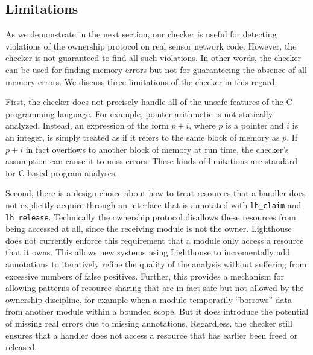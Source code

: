 \subsection{Limitations}

As we demonstrate in the next section, our checker is useful for
detecting violations of the ownership protocol on real sensor network
code.  However, the checker is not guaranteed to find all such
violations.  In other words, the checker can be used for finding
memory errors but not for guaranteeing the absence of all memory
errors.  We discuss three limitations of the checker in this regard.

First, the checker does not precisely handle all of the unsafe
features of the C programming language.  For example, pointer
arithmetic is not statically analyzed.  Instead, an expression of the
form $p+i$, where $p$ is a pointer and $i$ is an integer, is simply
treated as if it refers to the same block of memory as $p$.  If $p+i$
in fact overflows to another block of memory at run time, the
checker's assumption can cause it to miss errors.  These kinds of
limitations are standard for C-based program analyses.

Second, there is a design choice about how to treat resources that a
handler does not explicitly acquire through an interface that is
annotated with {\tt lh\_claim} and {\tt lh\_release}.  Technically the
ownership protocol disallows these resources from being accessed at
all, since the receiving module is not the owner.  
%
Lighthouse does not currently enforce this requirement that a module
only access a resource that it owns.
% 
This allows new systems using Lighthouse to incrementally add
annotations to iteratively refine the quality of the analysis without
suffering from excessive numbers of false positives.
%
Further, this provides a mechanism for allowing patterns of resource
sharing that are in fact safe but not allowed by the ownership
discipline, for example when a module temporarily ``borrows'' data from
another module within a bounded scope.
%
But it does introduce the potential of missing real errors due to
missing annotations.
%
Regardless, the checker still ensures that a handler does not access a
resource that has earlier been freed or released.


